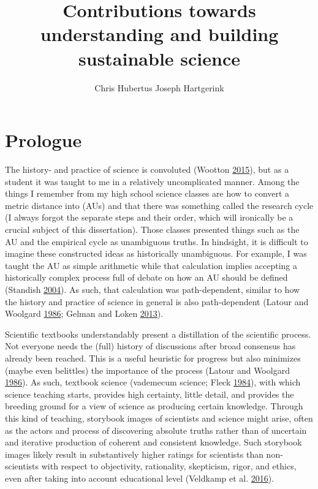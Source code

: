 \documentclass[a5paper]{book}
\title{Contributions towards understanding and building sustainable science}
\author{Chris Hubertus Joseph Hartgerink}
\date{}
\begin{document}
\maketitle

{
\setcounter{tocdepth}{1}
\tableofcontents
}
\chapter*{Prologue}\label{prologue}

The history- and practice of science is convoluted (Wootton
\protect\hyperlink{ref-isbn:9781846142109}{2015}), but as a student it
was taught to me in a relatively uncomplicated manner. Among the things
I remember from my high school science classes are how to convert a
metric distance into  (AUs) and that there was
something called the research cycle (I always forgot the separate steps
and their order, which will ironically be a crucial subject of this
dissertation). Those classes presented things such as the AU and the
empirical cycle as unambiguous truths. In hindsight, it is difficult to
imagine these constructed ideas as historically unambiguous. For
example, I was taught the AU as simple arithmetic while that calculation
implies accepting a historically complex process full of debate on how
an AU should be defined (Standish
\protect\hyperlink{ref-doi:10.1017ux2fs1743921305001365}{2004}). As
such, that calculation was path-dependent, similar to how the history
and practice of science in general is also path-dependent (Latour and
Woolgard \protect\hyperlink{ref-isbn:0692094187}{1986}; Gelman and Loken
\protect\hyperlink{ref-gelman-forking}{2013}).

Scientific textbooks understandably present a distillation of the
scientific process. Not everyone needs the (full) history of discussions
after broad consensus has already been reached. This is a useful
heuristic for progress but also minimizes (maybe even belittles) the
importance of the process (Latour and Woolgard
\protect\hyperlink{ref-isbn:0692094187}{1986}). As such, textbook
science (vademecum science; Fleck
\protect\hyperlink{ref-isbn:9780226253251}{1984}), with which science
teaching starts, provides high certainty, little detail, and provides
the breeding ground for a view of science as producing certain
knowledge. Through this kind of teaching, storybook images of scientists
and science might arise, often as the actors and process of discovering
absolute truths rather than of uncertain and iterative production of
coherent and consistent knowledge. Such storybook images likely result
in substantively higher ratings for scientists than non-scientists with
respect to objectivity, rationality, skepticism, rigor, and ethics, even
after taking into account educational level (Veldkamp et al.
\protect\hyperlink{ref-doi:10.1080ux2f08989621.2016.1268922}{2016}).
\end{document}

